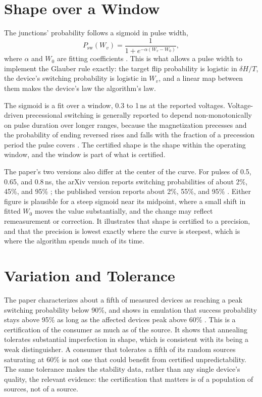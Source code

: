 \documentclass[11pt]{article}
\theoremstyle{definition}
\theoremstyle{remark}
\begin{document}
\section{Shape over a Window}

The junctions' probability follows a sigmoid in pulse width,
\begin{equation}
P_{\mathrm{sw}}(W_v) = \frac{1}{1 + e^{-\alpha (W_v - W_0)}},
\end{equation}
where $\alpha$ and $W_0$ are fitting coefficients \cite{li2026}. This is what allows a pulse width to implement the Glauber rule exactly: the target flip probability is logistic in $\delta H / T$, the device's switching probability is logistic in $W_v$, and a linear map between them makes the device's law the algorithm's law.

The sigmoid is a fit over a window, 0.3 to 1\,ns at the reported voltages. Voltage-driven precessional switching is generally reported to depend non-monotonically on pulse duration over longer ranges, because the magnetization precesses and the probability of ending reversed rises and falls with the fraction of a precession period the pulse covers \cite{shiota2012}. The certified shape is the shape within the operating window, and the window is part of what is certified.

The paper's two versions also differ at the center of the curve. For pulses of 0.5, 0.65, and 0.8\,ns, the arXiv version reports switching probabilities of about 2\%, 45\%, and 95\% \cite{li2025arxiv}; the published version reports about 2\%, 55\%, and 95\% \cite{li2026}. Either figure is plausible for a steep sigmoid near its midpoint, where a small shift in fitted $W_0$ moves the value substantially, and the change may reflect remeasurement or correction. It illustrates that shape is certified to a precision, and that the precision is lowest exactly where the curve is steepest, which is where the algorithm spends much of its time.

\section{Variation and Tolerance}

The paper characterizes about a fifth of measured devices as reaching a peak switching probability below 90\%, and shows in emulation that success probability stays above 95\% as long as the affected devices peak above 60\% \cite{li2026}. This is a certification of the consumer as much as of the source. It shows that annealing tolerates substantial imperfection in shape, which is consistent with its being a weak distinguisher. A consumer that tolerates a fifth of its random sources saturating at 60\% is not one that could benefit from certified unpredictability. The same tolerance makes the stability data, rather than any single device's quality, the relevant evidence: the certification that matters is of a population of sources, not of a source.
\end{document}
